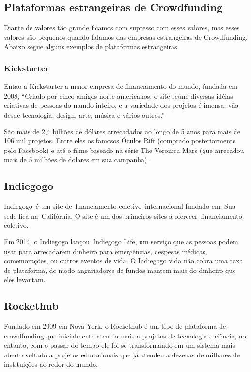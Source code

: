 \documentclass{classe_cn}                 %
\begin{document}
\subsection{Plataformas estrangeiras de Crowdfunding}

Diante de valores tão grande ficamos com supresso com esses valores, mas esses valores são pequenos quando falamos das empresas estrangeiras de Crowdfunding. Abaixo segue alguns exemplos de plataformas estrangeiras.

\subsubsection{Kickstarter}

Então a Kickstarter a maior empresa de financiamento do mundo, fundada em 2008, “Criado por cinco amigos norte-americanos, o site reúne diversas idéias criativas de pessoas do mundo inteiro, e a variedade dos projetos é imensa: vão desde tecnologia, design, arte, música e vários outros.” \cite{CANALTECH:2017}

São mais de 2,4 bilhões de dólares arrecadados ao longo de 5 anos para mais de 106 mil projetos. Entre eles os famosos Óculos Rift (comprado posteriormente pelo Facebook) e até o filme baseado na série The Veronica Mars (que arrecadou mais de 5 milhões de dolares em sua campanha).

\subsection{Indiegogo}

Indiegogo é um site de financiamento coletivo internacional fundado em. Sua sede fica na Califórnia. O site é um dos primeiros sites a oferecer financiamento coletivo.

Em 2014, o Indiegogo lançou Indiegogo Life, um serviço que as pessoas podem usar para arrecadarem dinheiro para emergências, despesas médicas, comemorações, ou outros eventos de vida. O Indiegogo vida não cobra uma taxa de plataforma, de modo angariadores de fundos mantem mais do dinheiro que eles levantam.

\subsection{Rockethub}

Fundado em 2009 em Nova York, o Rockethub é um tipo de plataforma de crowdfunding que inicialmente atendia mais a projetos de tecnologia e ciência, no entanto, com o passar do tempo ele foi se transformando em um sistema mais aberto voltado a projetos educacionais que já atendeu a dezenas de milhares de instituições ao redor do mundo.
\end{document}
